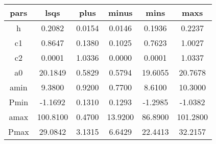 \begin{table}
\begin{tabular}{cccccc}
\hline \hline
pars & lsqs & plus & minus & mins & maxs \\
\hline
h & 0.2082 & 0.0154 & 0.0146 & 0.1936 & 0.2237 \\
c1 & 0.8647 & 0.1380 & 0.1025 & 0.7623 & 1.0027 \\
c2 & 0.0001 & 1.0336 & 0.0000 & 0.0001 & 1.0337 \\
a0 & 20.1849 & 0.5829 & 0.5794 & 19.6055 & 20.7678 \\
amin & 9.3800 & 0.9200 & 0.7700 & 8.6100 & 10.3000 \\
Pmin & -1.1692 & 0.1310 & 0.1293 & -1.2985 & -1.0382 \\
amax & 100.8100 & 0.4700 & 13.9200 & 86.8900 & 101.2800 \\
Pmax & 29.0842 & 3.1315 & 6.6429 & 22.4413 & 32.2157 \\
\hline
\end{tabular}
\end{table}
